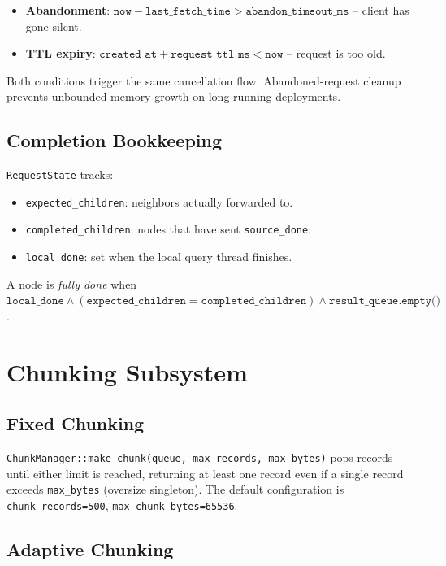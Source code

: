 \documentclass[conference]{IEEEtran}
\begin{document}
\begin{itemize}
  \item \textbf{Abandonment}: $\texttt{now} - \texttt{last\_fetch\_time} >
        \texttt{abandon\_timeout\_ms}$ -- client has gone silent.
  \item \textbf{TTL expiry}: $\texttt{created\_at} +
        \texttt{request\_ttl\_ms} < \texttt{now}$ -- request is too old.
\end{itemize}

Both conditions trigger the same cancellation flow. Abandoned-request cleanup
prevents unbounded memory growth on long-running deployments.

\subsection{Completion Bookkeeping}

\texttt{RequestState} tracks:
\begin{itemize}
  \item \texttt{expected\_children}: neighbors actually forwarded to.
  \item \texttt{completed\_children}: nodes that have sent
        \texttt{source\_done}.
  \item \texttt{local\_done}: set when the local query thread finishes.
\end{itemize}

A node is \emph{fully done} when
$\texttt{local\_done} \wedge (\texttt{expected\_children} =
\texttt{completed\_children}) \wedge \texttt{result\_queue.empty()}$.

\section{Chunking Subsystem}
\label{sec:chunking}

\subsection{Fixed Chunking}

\texttt{ChunkManager::make\_chunk(queue, max\_records, max\_bytes)} pops
records until either limit is reached, returning at least one record even if
a single record exceeds \texttt{max\_bytes} (oversize singleton). The default
configuration is \texttt{chunk\_records=500}, \texttt{max\_chunk\_bytes=65536}.

\subsection{Adaptive Chunking}
\end{document}
